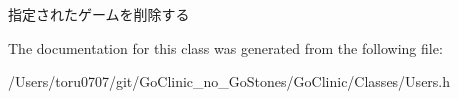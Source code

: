 \label{interface_users_a7a1b1e37f674755055ce137a77b7ad21}
指定されたゲームを削除する 

The documentation for this class was generated from the following file:\begin{DoxyCompactItemize}
\item 
/Users/toru0707/git/GoClinic\_\-no\_\-GoStones/GoClinic/Classes/Users.h\end{DoxyCompactItemize}
